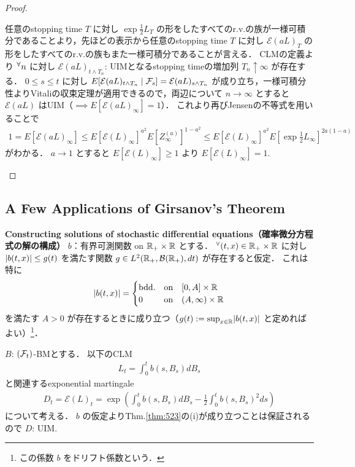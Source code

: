 \documentclass{jsarticle}
\begin{document}
\begin{proof}
\begin{description}
        任意のstopping time $T$ に対し $\exp\frac{1}{2}L_T$ の形をしたすべてのr.v.の族が一様可積分であることより，先ほどの表示から任意のstopping time $T$ に対し $\mathcal{E}(aL)_T$ の形をしたすべてのr.v.の族もまた一様可積分であることが言える．
        CLMの定義より ${}^{\forall} n$ に対し $\mathcal{E}(aL)_{t\wedge T_n}$: UIMとなるstopping timeの増加列 $T_n\uparrow\infty$ が存在する．
        $0\le s\le t$ に対し $E[\mathcal{E}(aL)_{t\wedge T_n}\mid\mathcal{F}_s]=\mathcal{E}(aL)_{s\wedge T_n}$ が成り立ち，一様可積分性よりVitaliの収束定理が適用できるので，両辺について $n\to\infty$ とすると $\mathcal{E}(aL)$ はUIM（$\implies E[\mathcal{E}(aL)_{\infty}]=1$）．
        これより再びJensenの不等式を用いることで
        \begin{align}
            1=E[\mathcal{E}(aL)_{\infty}]
            \le E[\mathcal{E}(L)_\infty]^{a^2}
            E[Z_{\infty}^{(a)}]^{1-a^2}
            \le E[\mathcal{E}(L)_\infty]^{a^2}
            E\left[\exp\frac{1}{2}L_\infty\right]^{2a(1-a)}
        \end{align}
        がわかる．
        $a\to1$ とすると $E[\mathcal{E}(L)_\infty]\ge1$ より $E[\mathcal{E}(L)_\infty]=1.$
    \end{description}
\end{proof}


\subsection{A Few Applications of Girsanov's Theorem}

\textbf{Constructing solutions of stochastic differential equations（確率微分方程式の解の構成）}
$b$：有界可測関数 on $\mathbb{R}_+\times\mathbb{R}$ とする．
${}^{\forall} (t,x)\in\mathbb{R}_+\times\mathbb{R}$ に対し $\lvert b(t,x)\rvert\le g(t)$ を満たす関数 $g\in L^2(\mathbb{R}_+,\mathcal{B}(\mathbb{R}_+),dt)$ が存在すると仮定．
これは特に
\begin{align}
    \lvert b(t,x)\rvert=
    \begin{cases}
        \text{bdd.} &\text{on}\quad [0,A]\times\mathbb{R} \\
        0 &\text{on}\quad (A,\infty)\times\mathbb{R}
    \end{cases}
\end{align}
を満たす $A>0$ が存在するときに成り立つ（$g(t):=\sup_{x\in\mathbb{R}}\lvert b(t,x)\rvert$ と定めればよい）\footnote{この係数 $b$ をドリフト係数という．}．

$B$: $(\mathcal{F}_t)$-BMとする．
以下のCLM
\begin{align}
    L_t=\int_0^t b(s,B_s)dB_s
\end{align}
と関連するexponential martingale
\begin{align}
    D_t
    = \mathcal{E}(L)_t
    = \exp\left(\int_0^t b(s,B_s)dB_s-\frac{1}{2}\int_0^t b(s,B_s)^2 ds\right)
\end{align}
について考える．
$b$ の仮定よりThm.\ref{thm:523}の(i)が成り立つことは保証されるので $D$: UIM.
\end{document}
